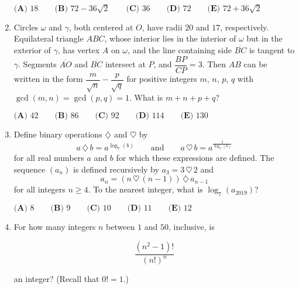 \documentclass{article}
\begin{document}
\begin{enumerate}[label=\arabic*., itemsep=0.5em]
\(\textbf{(A) } 18 \qquad \textbf{(B) } 72-36\sqrt2 \qquad \textbf{(C) } 36 \qquad \textbf{(D) } 72 \qquad \textbf{(E) } 72+36\sqrt2\)\par \vspace{0.5em}\item Circles \(\omega\) and \(\gamma\), both centered at \(O\), have radii \(20\) and \(17\), respectively. Equilateral triangle \(ABC\), whose interior lies in the interior of \(\omega\) but in the exterior of \(\gamma\), has vertex \(A\) on \(\omega\), and the line containing side \(\overline{BC}\) is tangent to \(\gamma\). Segments \(\overline{AO}\) and \(\overline{BC}\) intersect at \(P\), and \(\dfrac{BP}{CP} = 3\). Then \(AB\) can be written in the form \(\dfrac{m}{\sqrt{n}} - \dfrac{p}{\sqrt{q}}\) for positive integers \(m\), \(n\), \(p\), \(q\) with \(\gcd(m,n) = \gcd(p,q) = 1\). What is \(m+n+p+q\)?
\(\phantom{  }\)

\(\textbf{(A) } 42 \qquad \textbf{(B) }86 \qquad \textbf{(C) } 92 \qquad \textbf{(D) } 114 \qquad \textbf{(E) } 130\)\par \vspace{0.5em}\item Define binary operations \(\diamondsuit\) and \(\heartsuit\) by 
\begin{equation*}
a \, \diamondsuit \, b = a^{\log_{7}(b)} \qquad \text{and} \qquad a  \, \heartsuit \, b = a^{\frac{1}{\log_{7}(b)}}
\end{equation*}
for all real numbers \(a\) and \(b\) for which these expressions are defined. The sequence \((a_n)\) is defined recursively by \(a_3 = 3\, \heartsuit\, 2\) and 
\begin{equation*}
a_n = (n\, \heartsuit\, (n-1)) \,\diamondsuit\, a_{n-1}
\end{equation*}
for all integers \(n \geq 4\). To the nearest integer, what is \(\log_{7}(a_{2019})\)?

\(\textbf{(A) } 8 \qquad  \textbf{(B) } 9 \qquad \textbf{(C) } 10 \qquad \textbf{(D) } 11 \qquad \textbf{(E) } 12\)\par \vspace{0.5em}\item For how many integers \(n\) between \(1\) and \(50\), inclusive, is

\begin{equation*}
\frac{(n^2-1)!}{(n!)^n}
\end{equation*}

an integer? (Recall that \(0! = 1\).)


\end{enumerate}
\end{document}
